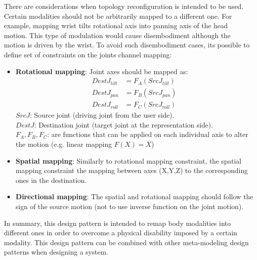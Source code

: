 There are considerations when topology reconfiguration is intended to be used. Certain modalities should not be arbitrarily mapped to a different one. For example, mapping wrist tilts rotational axis into panning axis of the head motion. This type of modulation would cause disembodiment although the motion is driven by the wrist. To avoid such disembodiment cases, its possible to define set of constraints on the joints channel mapping:
\begin{itemize}
\item \textbf{Rotational mapping}: Joint axes should be mapped as:
\begin{equation}
\begin{split}
DestJ_{tilt} &=F_{A}(SrcJ_{tilt}) \\
DestJ_{pan} &=F_{B}(SrcJ_{pan}) \\
DestJ_{roll} &=F_{C}(SrcJ_{roll})
\end{split}
\end{equation}
$SrcJ $: Source joint (driving joint from the user side).\\
$DestJ$: Destination joint (target joint at the representation side).\\
$F_{A},F_{B},F_{C}$: are functions that can be applied on each individual axis to alter the motion (e.g. linear mapping $F(X)=X$)

\item \textbf{Spatial mapping}: Similarly to rotational mapping constraint, the spatial mapping constraint the mapping between axes (X,Y,Z) to the corresponding ones in the destination.

\item \textbf{Directional mapping}: The spatial and rotational mapping should follow the sign of the source motion (not to use inverse function on the joint motion).

\end{itemize}

In summary, this design pattern is intended to remap body modalities into different ones in order to overcome a physical disability imposed by a certain modality. This design pattern can be combined with other meta-modeling design patterns when designing a system.

